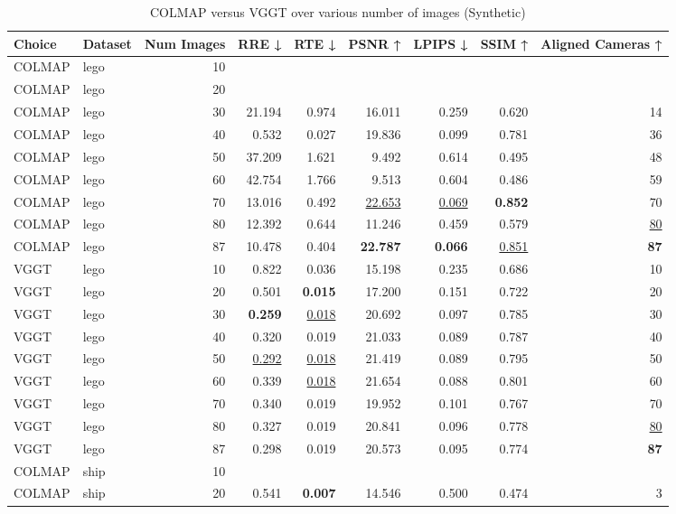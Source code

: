 \begin{table}[H]
\caption{\ifdefined\customcaption \customcaption \else COLMAP versus VGGT over various number of images (Synthetic) \fi}
\label{tab:01_num_images_synthetic}
\centering
\scriptsize
\begin{tabular}{llrrrrrrr}
\toprule
Choice & Dataset & Num Images & RRE ↓ & RTE ↓ & PSNR ↑ & LPIPS ↓ & SSIM ↑ & Aligned Cameras ↑ \\
\midrule
COLMAP & lego & 10 &  &  &  &  &  &  \\
COLMAP & lego & 20 &  &  &  &  &  &  \\
COLMAP & lego & 30 & 21.194 & 0.974 & 16.011 & 0.259 & 0.620 & 14 \\
COLMAP & lego & 40 & 0.532 & 0.027 & 19.836 & 0.099 & 0.781 & 36 \\
COLMAP & lego & 50 & 37.209 & 1.621 & 9.492 & 0.614 & 0.495 & 48 \\
COLMAP & lego & 60 & 42.754 & 1.766 & 9.513 & 0.604 & 0.486 & 59 \\
COLMAP & lego & 70 & 13.016 & 0.492 & \underline{22.653} & \underline{0.069} & \textbf{0.852} & 70 \\
COLMAP & lego & 80 & 12.392 & 0.644 & 11.246 & 0.459 & 0.579 & \underline{80} \\
COLMAP & lego & 87 & 10.478 & 0.404 & \textbf{22.787} & \textbf{0.066} & \underline{0.851} & \textbf{87} \\
VGGT & lego & 10 & 0.822 & 0.036 & 15.198 & 0.235 & 0.686 & 10 \\
VGGT & lego & 20 & 0.501 & \textbf{0.015} & 17.200 & 0.151 & 0.722 & 20 \\
VGGT & lego & 30 & \textbf{0.259} & \underline{0.018} & 20.692 & 0.097 & 0.785 & 30 \\
VGGT & lego & 40 & 0.320 & 0.019 & 21.033 & 0.089 & 0.787 & 40 \\
VGGT & lego & 50 & \underline{0.292} & \underline{0.018} & 21.419 & 0.089 & 0.795 & 50 \\
VGGT & lego & 60 & 0.339 & \underline{0.018} & 21.654 & 0.088 & 0.801 & 60 \\
VGGT & lego & 70 & 0.340 & 0.019 & 19.952 & 0.101 & 0.767 & 70 \\
VGGT & lego & 80 & 0.327 & 0.019 & 20.841 & 0.096 & 0.778 & \underline{80} \\
VGGT & lego & 87 & 0.298 & 0.019 & 20.573 & 0.095 & 0.774 & \textbf{87} \\
\midrule
COLMAP & ship & 10 &  &  &  &  &  &  \\
COLMAP & ship & 20 & 0.541 & \textbf{0.007} & 14.546 & 0.500 & 0.474 & 3 \\

\end{tabular}
\end{table}
